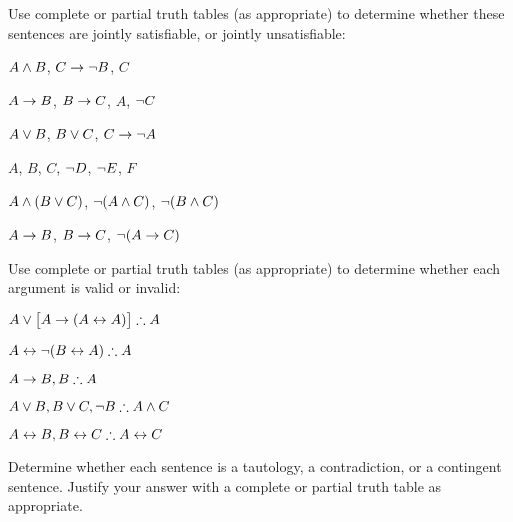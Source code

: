 \problempart
\label{pr.TT.satisfiable4}
Use complete or partial truth tables (as appropriate) to determine whether these sentences are jointly satisfiable, or jointly unsatisfiable:
\begin{compactlist}
\item $A \wedge B$, $C\rightarrow \neg B$, $C$ %
\item $A\rightarrow B$, $B\rightarrow C$, $A$, $\neg C$ %
\item $A \vee B$, $B\vee C$, $C\rightarrow \neg A$ %
\item $A$, $B$, $C$, $\neg D$, $\neg E$, $F$ %
\item $A \wedge (B \vee C)$, $\neg(A \wedge C)$, $\neg(B \wedge C)$ %
\item $A \rightarrow B$, $B \rightarrow C$, $\neg(A \rightarrow C)$ %
\end{compactlist}

\problempart
\label{pr.TT.valid4}
Use complete or partial truth tables (as appropriate) to determine whether each argument is valid or invalid:
\begin{compactlist}
\item $A\eor\bigl[A\eif(A\eiff A)\bigr] \therefore A$ %
\item $A\eiff\enot(B\eiff A) \therefore A$ %
\item $A\eif B, B \therefore A$ %
\item $A\eor B, B\eor C, \enot B \therefore A \eand C$ %
\item $A\eiff B, B\eiff C \therefore A\eiff C$ %
\end{compactlist}

\problempart
\label{pr.TT.TTorC3}
Determine whether each sentence is a tautology, a contradiction, or a contingent sentence. Justify your answer with a complete or partial truth table as appropriate.


